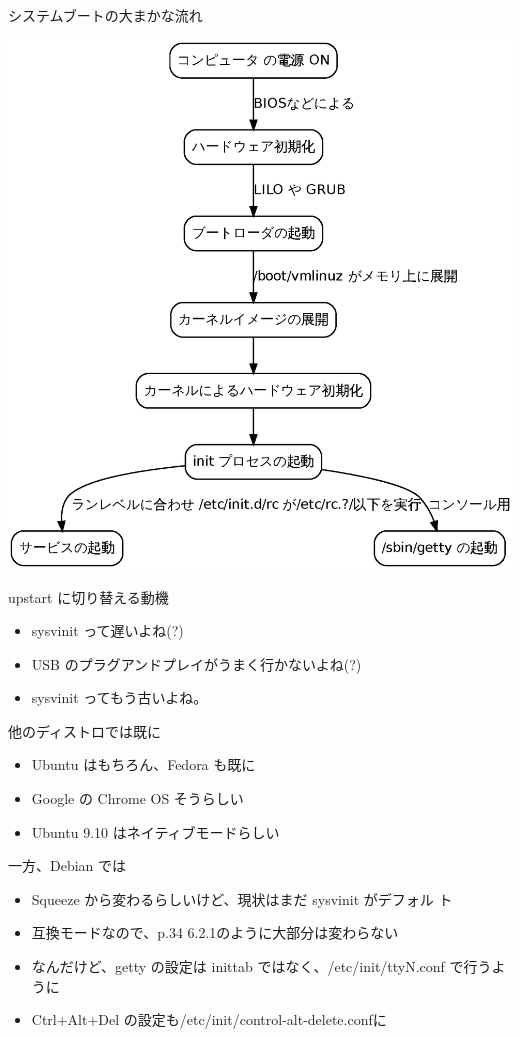 \begin{frame}{システムブートの大まかな流れ}
\begin{center}
\includegraphics[height=0.78\hsize]{image201002/sysvinit.eps}
\end{center}
\end{frame}

\begin{frame}{upstart に切り替える動機}
\begin{itemize}
 \item sysvinit って遅いよね(?)
 \item USB のプラグアンドプレイがうまく行かないよね(?)
 \item sysvinit ってもう古いよね。
\end{itemize}
\end{frame}


\begin{frame}{他のディストロでは既に}
\begin{itemize}
 \item Ubuntu はもちろん、Fedora も既に
 \item Google の Chrome OS そうらしい
 \item Ubuntu 9.10 はネイティブモードらしい
\end{itemize}
\end{frame}

\begin{frame}{一方、Debian では}
\begin{itemize}
 \item Squeeze から変わるらしいけど、現状はまだ sysvinit がデフォル
       ト
 \item 互換モードなので、p.34 6.2.1のように大部分は変わらない
 \item なんだけど、getty の設定は inittab ではなく、/etc/init/ttyN.conf
       で行うように
 \item Ctrl+Alt+Del の設定も/etc/init/control-alt-delete.confに
\end{itemize}
\end{frame}

